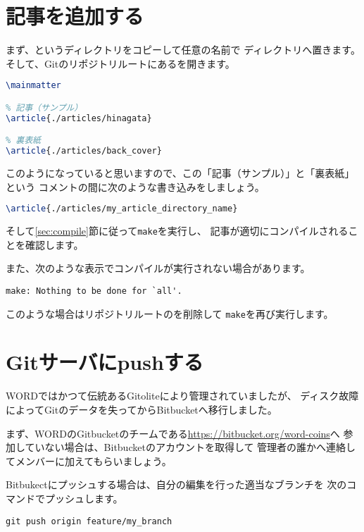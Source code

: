 \documentclass[../../main]{subfiles}
\begin{document}
\section{記事を追加する}

まず、というディレクトリをコピーして任意の名前で
ディレクトリへ置きます。
そして、Gitのリポジトリルートにあるを開きます。

\begin{lstlisting}[language=TeX]
\mainmatter

% 記事（サンプル）
\article{./articles/hinagata}

% 裏表紙
\article{./articles/back_cover}
\end{lstlisting}

このようになっていると思いますので、この「記事（サンプル）」と「裏表紙」という
コメントの間に次のような書き込みをしましょう。

\begin{lstlisting}[language=TeX]
\article{./articles/my_article_directory_name}
\end{lstlisting}

そして\ref{sec:compile}節に従って\lstinline|make|を実行し、
記事が適切にコンパイルされることを確認します。

また、次のような表示でコンパイルが実行されない場合があります。

\begin{lstlisting}
make: Nothing to be done for `all'.
\end{lstlisting}

このような場合はリポジトリルートのを削除して
\lstinline|make|を再び実行します。

\section{Gitサーバにpushする}

WORDではかつて伝統あるGitoliteにより管理されていましたが、
ディスク故障によってGitのデータを失ってからBitbucketへ移行しました。

まず、WORDのGitbucketのチームである\url{https://bitbucket.org/word-coins}へ
参加していない場合は、Bitbucketのアカウントを取得して
管理者の誰かへ連絡してメンバーに加えてもらいましょう。

Bitbukectにプッシュする場合は、自分の編集を行った適当なブランチを
次のコマンドでプッシュします。

\begin{lstlisting}[mathescape]
git push origin feature/my_branch
\end{lstlisting}
\end{document}
